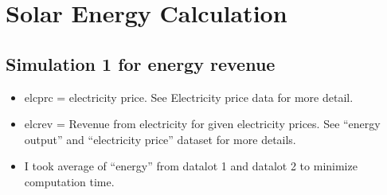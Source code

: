 \documentclass[
  letterpaper,
  DIV=11,
  numbers=noendperiod]{scrartcl}
\begin{document}
\section{Solar Energy Calculation}\label{solar-energy-calculation}

\subsection{Simulation 1 for energy
revenue}\label{simulation-1-for-energy-revenue}

\begin{itemize}
\item
  elcprc = electricity price. See Electricity price data for more
  detail.
\item
  elcrev = Revenue from electricity for given electricity prices. See
  ``energy output'' and ``electricity price'' dataset for more details.
\item
  I took average of ``energy'' from datalot 1 and datalot 2 to minimize
  computation time.
\end{itemize}
\end{document}
